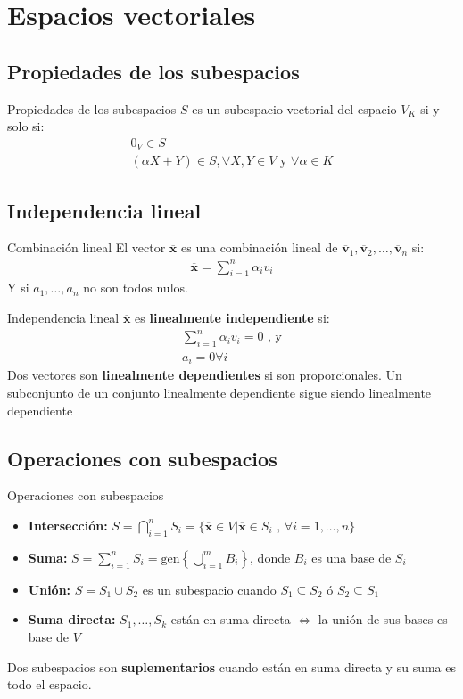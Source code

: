 \documentclass[a4paper, twoside]{article}
\numberwithin{equation}{section}
\numberwithin{figure}{section}
\numberwithin{table}{section}
\newcommand{\vect}[1]{\overline{\textbf{#1}}}
\newcommand{\gen}[1]{\text{gen}\left\{#1\right\}}
\begin{document}
\newpage
\section{Espacios vectoriales}
\subsection{Propiedades de los subespacios}
\begin{corolario*}{Propiedades de los subespacios}
	$S$ es un subespacio vectorial del espacio $V_K$ si y solo si:
	\begin{align}
		0_V \in S \\
		(\alpha X+Y) \in S, \forall X,Y \in V \text{ y } \forall \alpha \in K
	\end{align}
\end{corolario*}

\subsection{Independencia lineal}
\begin{definicion*}{Combinación lineal}
	El vector $\vect{x}$ es una combinación lineal de $\vect{v}_1,\vect{v}_2,\ldots,\vect{v}_n$ si:
	\begin{align}
		\vect{x}=\sum_{i=1}^n \alpha_i v_i
	\end{align}
	Y si $a_1,\ldots,a_n$ no son todos nulos.
\end{definicion*}

\begin{definicion*}{Independencia lineal}
	$\vect{x}$ es \textbf{linealmente independiente} si:
	\begin{align}
		\sum_{i=1}^n \alpha_i v_i=0 \text{ , y} \\
		a_i=0 \forall i
	\end{align}
	Dos vectores son \textbf{linealmente dependientes} si son proporcionales. Un subconjunto de un conjunto linealmente dependiente sigue siendo linealmente dependiente
\end{definicion*}

\subsection{Operaciones con subespacios}
\begin{corolario*}{Operaciones con subespacios}
	\begin{itemize}
		\item \textbf{Intersección:} $S=\bigcap_{i=1}^n S_i=\{ \vect{x} \in V \vert \vect{x} \in S_i \text{ , } \forall i=1,\ldots,n \}$
		\item \textbf{Suma:} $S=\sum_{i=1}^n S_i=\gen{\bigcup_{i=1}^m B_i}$, donde $B_i$ es una base de $S_i$
		\item \textbf{Unión:} $S=S_1 \cup S_2$ es un subespacio cuando $S_1 \subseteq S_2$ ó $S_2 \subseteq S_1$
		\item \textbf{Suma directa:} $S_1,\ldots,S_k$ están en suma directa $\Longleftrightarrow$ la unión de sus bases es base de $V$
	\end{itemize}
	Dos subespacios son \textbf{suplementarios} cuando están en suma directa y su suma es todo el espacio.
\end{corolario*}
\end{document}
